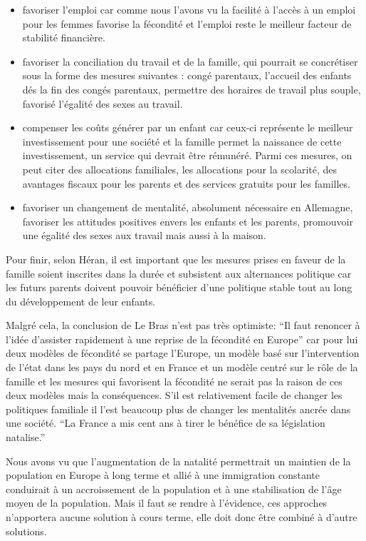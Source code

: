 \begin{itemize}
  \item favoriser l’emploi car comme nous l’avons vu la facilité à l’accès à un emploi pour les femmes favorise la fécondité et l’emploi reste le meilleur facteur de stabilité financière. 
  \item favoriser la conciliation du travail et de la famille, qui pourrait se concrétiser sous la forme des mesures suivantes : congé parentaux, l’accueil des enfants dés la fin des congés parentaux, permettre des horaires de travail plus souple, favorisé l’égalité des sexes au travail. 
  \item compenser les coûts générer par un enfant car ceux-ci représente le meilleur investissement pour une société et la famille permet la naissance de cette investissement, un service qui devrait être rémunéré. Parmi ces mesures, on peut citer des allocations familiales, les allocations pour la scolarité, des avantages fiscaux pour les parents et des services gratuits pour les familles.
  \item favoriser un changement de mentalité, absolument nécessaire en Allemagne, favoriser les attitudes positives envers les enfants et les parents, promouvoir une égalité des sexes aux travail mais aussi à la maison. 
\end{itemize}

Pour finir, selon Héran, il est important que les mesures prises en faveur de la famille soient inscrites dans la durée et subsistent aux alternances politique car les futurs parents doivent pouvoir bénéficier d’une politique stable tout au long du développement de leur enfants\citep[pp.14]{heran}. 

Malgré cela, la conclusion de Le Bras n’est pas très optimiste: “Il faut renoncer à l’idée d’assister rapidement à une reprise de la fécondité en Europe”\citep[pp.27]{heran} car pour lui deux modèles de fécondité se partage l’Europe, un modèle basé sur l’intervention de l’état dans les pays du nord et en France et un modèle centré sur le rôle de la famille et les mesures qui favorisent la fécondité ne serait pas la raison de ces deux modèles mais la conséquences. S’il est relativement facile de changer les politiques familiale il l’est beaucoup plus de changer les mentalités ancrée dans une société. “La France a mis cent ans à tirer le bénéfice de sa législation natalise.”\citep[pp.28]{heran}

Nous avons vu que l’augmentation de la natalité permettrait un maintien de la population en Europe à long terme et allié à une immigration constante conduirait à un accroissement de la population et à une stabilisation de l'âge moyen de la population. Mais il faut se rendre à l’évidence, ces approches n'apportera aucune solution à cours terme, elle doit donc être combiné à d’autre solutions.  

